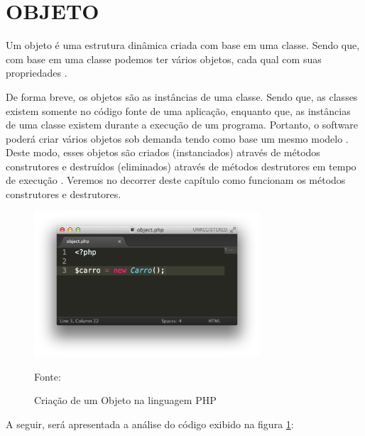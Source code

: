 \section{OBJETO}

Um objeto é uma estrutura dinâmica criada com base em uma classe. Sendo que, 
com base em uma classe podemos ter vários objetos, cada qual com suas 
propriedades \cite{phpProgramandoComOrientacaoAObjetos}. 

De forma breve, os objetos são as instâncias de uma classe. Sendo que, as
classes existem somente no código fonte de uma aplicação, enquanto que, as 
instâncias de uma classe existem durante a execução de um programa. Portanto, 
o software poderá criar vários objetos sob demanda tendo como base um mesmo 
modelo \cite{ios7ProgrammingFundamentalsObjectiveCXcodeAndCocoaBasics}. Deste
modo, esses objetos são criados (instanciados) através de métodos construtores 
e destruídos (eliminados) através de métodos destrutores em tempo de execução
\cite{umlEC++GuiaPraticoDeDesenvolvimentoOrientadoAObjeto}. Veremos no decorrer
deste capítulo como funcionam os métodos construtores e destrutores.

\begin{figure}[h!tb]
	\label{fig:objeto}
	
	\centering
	\caption{Criação de um Objeto na linguagem PHP}
	
	\centering
	\includegraphics[width=0.75\textwidth]{images/object.png}
	
	\centering
	\footnotesize Fonte: \fonteOAutor
\end{figure}

\FloatBarrier 	%

A seguir, será apresentada a análise do código exibido na
figura \ref{fig:objeto}: 

